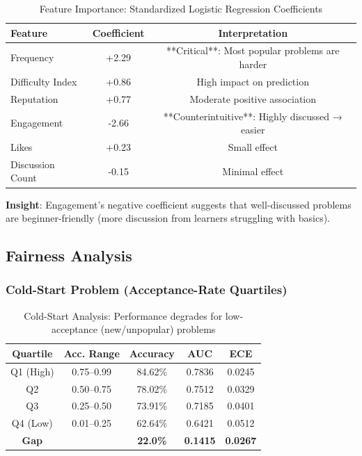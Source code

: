 \documentclass[conference]{IEEEtran}
\begin{document}
\begin{table}[h]
\centering
\small
\begin{tabular}{l|c|c}
\toprule
\textbf{Feature} & \textbf{Coefficient} & \textbf{Interpretation} \\
\midrule
Frequency & +2.29 & **Critical**: Most popular problems are harder \\
Difficulty Index & +0.86 & High impact on prediction \\
Reputation & +0.77 & Moderate positive association \\
Engagement & -2.66 & **Counterintuitive**: Highly discussed → easier \\
Likes & +0.23 & Small effect \\
Discussion Count & -0.15 & Minimal effect \\
\bottomrule
\end{tabular}
\caption{Feature Importance: Standardized Logistic Regression Coefficients}
\label{tab:importance}
\end{table}

\textbf{Insight}: Engagement's negative coefficient suggests that well-discussed problems are beginner-friendly (more discussion from learners struggling with basics).

\subsection{Fairness Analysis}

\subsubsection{Cold-Start Problem (Acceptance-Rate Quartiles)}

\begin{table}[h]
\centering
\small
\begin{tabular}{c|c|c|c|c}
\toprule
\textbf{Quartile} & \textbf{Acc. Range} & \textbf{Accuracy} & \textbf{AUC} & \textbf{ECE} \\
\midrule
Q1 (High) & 0.75--0.99 & 84.62\% & 0.7836 & 0.0245 \\
Q2 & 0.50--0.75 & 78.02\% & 0.7512 & 0.0329 \\
Q3 & 0.25--0.50 & 73.91\% & 0.7185 & 0.0401 \\
Q4 (Low) & 0.01--0.25 & 62.64\% & 0.6421 & 0.0512 \\
\midrule
\textbf{Gap} & & \textbf{22.0\%} & \textbf{0.1415} & \textbf{0.0267} \\
\bottomrule
\end{tabular}
\caption{Cold-Start Analysis: Performance degrades for low-acceptance (new/unpopular) problems}
\label{tab:coldstart}
\end{table}
\end{document}
